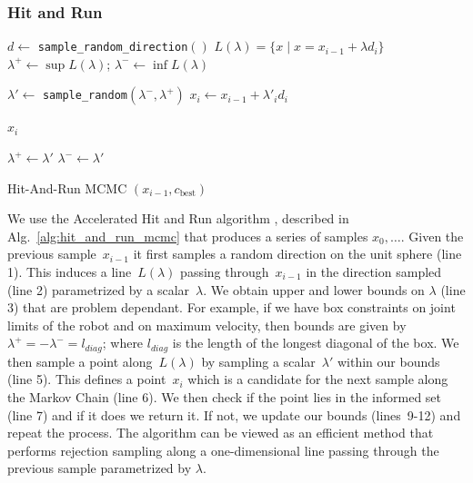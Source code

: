 \documentclass[letterpaper, 10 pt, conference]{ieeeconf}  %
\begin{document}
\subsubsection{Hit and Run}
\begin{algorithm}[t]
	\begin{algorithmic}[1]
		\STATE $d \leftarrow$ \texttt{sample\_random\_direction}$()$
		\STATE $ L(\lambda) = \{  x \mid x = x_{i-1} + \lambda d_i \} $
		\STATE $ \lambda^{+} \leftarrow \sup L(\lambda) $; 
				\hspace{3mm} 
			   $ \lambda^{-} \leftarrow \inf L(\lambda) $
			   
		\LOOP


		\STATE $ \lambda' \leftarrow$ \texttt{sample\_random}$ (\lambda^{-} , \lambda^{+})$
		\STATE $ x_{i} \leftarrow x_{i-1} + \lambda'_{i} d_i $
		
		  \RETURN $ x_{i}$
		\ENDIF


			\STATE $ \lambda^{+} \leftarrow \lambda' $
		\ELSE
			\STATE $ \lambda^{-} \leftarrow \lambda'$
		\ENDIF
		
		\ENDLOOP
  	\end{algorithmic}
	\caption{Hit-And-Run MCMC $(x_{i-1}, c_{\text{best}})$}
	\label{alg:hit_and_run_mcmc}	
\end{algorithm}

We use the Accelerated Hit and Run algorithm \cite{KSZ11}, described in Alg.~\ref{alg:hit_and_run_mcmc} that produces a series of samples $x_0, \ldots$.
Given the previous sample~$x_{i-1}$ it first  samples a random direction on the unit sphere (line 1).
This induces a line~$L(\lambda)$ passing through~$x_{i-1}$  in the direction sampled (line 2) parametrized by a scalar~$\lambda$.
We obtain upper and lower bounds on $\lambda$ (line 3) that are problem dependant. For example, if we have box constraints on joint limits of the robot and on maximum velocity, then bounds are given by $\lambda^{+} = -\lambda^{-} = l_{diag}$; where $l_{diag}$ is the length of the longest diagonal of the box.
We then sample a point along~$L(\lambda)$ by sampling a scalar~$\lambda'$ within our bounds (line 5).
This defines a point~$x_{i}$ which is a candidate for the next sample along the Markov Chain (line 6).
We then check if the point lies in the informed set (line 7) and if it does we return it.
If not, we update our bounds (lines~9-12) and repeat the process.
The algorithm can be viewed as an efficient method that performs rejection sampling along a one-dimensional line passing through the previous sample parametrized by $\lambda$.
\end{document}
